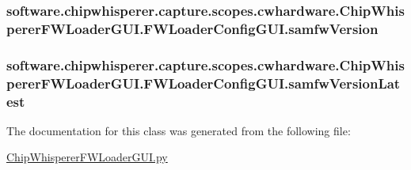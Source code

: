 \subsubsection[{samfw\+Version}]{\setlength{\rightskip}{0pt plus 5cm}software.\+chipwhisperer.\+capture.\+scopes.\+cwhardware.\+Chip\+Whisperer\+F\+W\+Loader\+G\+U\+I.\+F\+W\+Loader\+Config\+G\+U\+I.\+samfw\+Version}\label{classsoftware_1_1chipwhisperer_1_1capture_1_1scopes_1_1cwhardware_1_1ChipWhispererFWLoaderGUI_1_1FWLoaderConfigGUI_a80b6c9c862e4849673288ccc0f9eba12}
\hypertarget{classsoftware_1_1chipwhisperer_1_1capture_1_1scopes_1_1cwhardware_1_1ChipWhispererFWLoaderGUI_1_1FWLoaderConfigGUI_aca483582160f3d44305cc3609dd4a2d7}{}
\subsubsection[{samfw\+Version\+Latest}]{\setlength{\rightskip}{0pt plus 5cm}software.\+chipwhisperer.\+capture.\+scopes.\+cwhardware.\+Chip\+Whisperer\+F\+W\+Loader\+G\+U\+I.\+F\+W\+Loader\+Config\+G\+U\+I.\+samfw\+Version\+Latest}\label{classsoftware_1_1chipwhisperer_1_1capture_1_1scopes_1_1cwhardware_1_1ChipWhispererFWLoaderGUI_1_1FWLoaderConfigGUI_aca483582160f3d44305cc3609dd4a2d7}


The documentation for this class was generated from the following file\+:\begin{DoxyCompactItemize}
\item 
\hyperlink{ChipWhispererFWLoaderGUI_8py}{Chip\+Whisperer\+F\+W\+Loader\+G\+U\+I.\+py}\end{DoxyCompactItemize}
